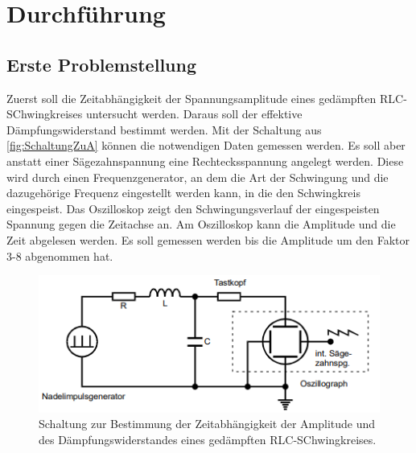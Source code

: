 \section{Durchführung}
\label{sec:Durchfuehrung}
\subsection{Erste Problemstellung}
Zuerst soll die Zeitabhängigkeit der Spannungsamplitude eines gedämpften RLC-SChwingkreises untersucht werden. Daraus soll der effektive Dämpfungswiderstand bestimmt
werden. Mit der Schaltung aus \autoref{fig:SchaltungZuA} können die notwendigen Daten gemessen werden. Es soll aber anstatt einer Sägezahnspannung eine Rechtecksspannung 
angelegt werden. Diese wird durch einen Frequenzgenerator, an dem die Art der Schwingung und die dazugehörige Frequenz eingestellt werden kann, in die den Schwingkreis 
eingespeist. Das Oszilloskop zeigt den Schwingungsverlauf der eingespeisten Spannung gegen die Zeitachse an. Am Oszilloskop kann die Amplitude und die Zeit abgelesen werden. Es soll 
gemessen werden bis die Amplitude um den Faktor 3-8 abgenommen hat. 
\begin{figure}
    \includegraphics[width=\textwidth]{content/SchaltungZuA.pdf}
    \centering
    \caption{Schaltung zur Bestimmung der Zeitabhängigkeit der Amplitude und des Dämpfungswiderstandes eines gedämpften RLC-SChwingkreises.}
    \label{fig:SchaltungZuA}
\end{figure}
